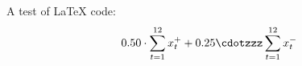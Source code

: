 A test of LaTeX code: \[ 0.50 \cdot \sum_{t = 1}^{12} x_t^+ + 0.25 \cdotzzz \sum_{t = 1}^{12} x_t^- \] 
  